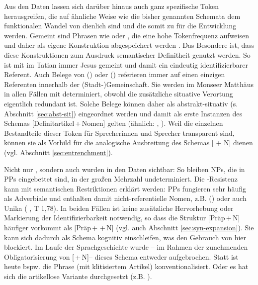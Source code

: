 Aus den Daten lassen sich darüber hinaus auch ganz spezifische Token herausgreifen, die auf ähnliche Weise wie die bisher genannten Schemata dem funktionalen Wandel von  dienlich sind und die somit zu  für die Entwicklung werden. Gemeint sind Phrasen wie  oder , die eine hohe Tokenfrequenz aufweisen und daher als eigene Konstruktion abgespeichert werden \parencite[= Token-Entrenchment, s.][]{Ziem2013}. Das Besondere ist, dass diese Konstruktionen zum Ausdruck semantischer Definitheit genutzt werden. So ist mit   im Tatian immer Jesus gemeint und damit ein eindeutig identifizierbarer Referent. Auch Belege von   () oder   () referieren immer auf einen einzigen Referenten innerhalb der (Stadt-)Gemeinschaft. Sie werden im Monseer Matthäus in allen Fällen mit  determiniert, obwohl die zusätzliche situative Verortung eigentlich redundant ist. Solche Belege können daher als abstrakt-situativ (s. Abschnitt \ref{sec:abst-sit}) eingeordnet werden und damit als erste Instanzen des Schemas [Definitartikel\,+\,Nomen] gelten (ähnlich: , ). Weil die einzelnen Bestandteile dieser Token für Sprecherinnen und Sprecher transparent sind, können sie als Vorbild für die analogische Ausbreitung des Schemas [ + N] dienen (vgl. Abschnitt \ref{sec:entrenchment}). 

Nicht nur , sondern auch  wurden in den Daten sichtbar: So bleiben NPs, die in PPs eingebettet sind, in der großen Mehrzahl undeterminiert. Die -Resistenz kann mit semantischen Restriktionen erklärt werden: PPs fungieren sehr häufig als Adverbiale und enthalten damit nicht-referentielle Nomen, z.B.  () oder auch Unika ( , T 1,78). In beiden Fällen ist keine zusätzliche Hervorhebung oder Markierung der Identifizierbarkeit notwendig, so dass die Struktur [Präp\,+\,N] häufiger vorkommt als [Präp\,+\,\,+\,N] (vgl. auch Abschnitt \ref{sec:syn-expansion}). Sie kann sich dadurch als Schema kognitiv einschleifen, was den Gebrauch von  hier blockiert. Im Laufe der Sprachgeschichte wurde -- im Rahmen der zunehmenden Obligatorisierung von [\,+\,N]-- dieses Schema entweder aufgebrochen. Statt  ist heute bspw. die Phrase  (mit klitisiertem Artikel) konventionalisiert. Oder es hat sich die artikellose Variante durchgesetzt (z.B. ).
